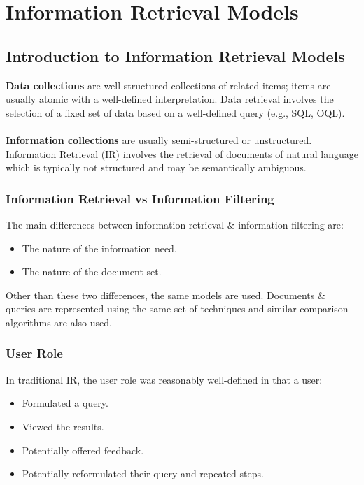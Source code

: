 \documentclass[a4paper,11pt]{article}
\begin{document}
\section{Information Retrieval Models}
\subsection{Introduction to Information Retrieval Models}
\textbf{Data collections} are well-structured collections of related items; items are usually atomic with a 
well-defined interpretation.
Data retrieval involves the selection of a fixed set of data based on a well-defined query (e.g., SQL, OQL).
\\\\
\textbf{Information collections} are usually semi-structured or unstructured.
Information Retrieval (IR) involves the retrieval of documents of natural language which is typically not 
structured and may be semantically ambiguous.

\subsubsection{Information Retrieval vs Information Filtering}
The main differences between information retrieval \& information filtering are:
\begin{itemize}
    \item   The nature of the information need.
    \item   The nature of the document set.
\end{itemize}

Other than these two differences, the same models are used.
Documents \& queries are represented using the same set of techniques and similar comparison algorithms are also
used.

\subsubsection{User Role}
In traditional IR, the user role was reasonably well-defined in that a user:
\begin{itemize}
    \item   Formulated a query.
    \item   Viewed the results.
    \item   Potentially offered feedback.
    \item   Potentially reformulated their query and repeated steps.
\end{itemize}
\end{document}
